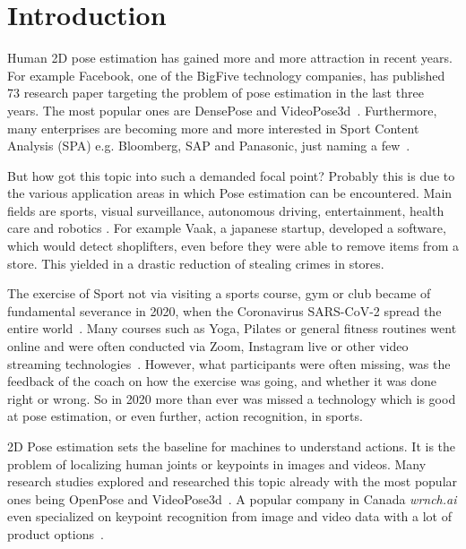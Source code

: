 

\chapter{Introduction} %

\label{introduction} %
\begin{flushleft}
Human 2D pose estimation has gained more and more attraction in recent years.
For example Facebook, one of the BigFive technology companies, has published 73 research paper targeting the problem of pose estimation in the last three years.
The most popular ones are DensePose and VideoPose3d~\cite{fbPub, DensePose, videopose3d}.
Furthermore, many enterprises are becoming more and more interested in Sport Content Analysis (SPA)
e.g. Bloomberg, SAP and Panasonic, just naming a few~\cite{sappanasonic, spaBloomberg}.
\end{flushleft}
\begin{flushleft}
But how got this topic into such a demanded focal point?
Probably this is due to the various application areas in which Pose estimation can be encountered.
Main fields are sports, visual surveillance, autonomous driving, entertainment, health care and robotics \cite{olympicsport, surveillance, kinectWalkDepression}.
For example Vaak, a japanese startup, developed a software, which would detect shoplifters,
even before they were able to remove items from a store.
This yielded in a drastic reduction of stealing crimes in stores.
\end{flushleft}
\begin{flushleft}
The exercise of Sport not via visiting a sports course, gym or club became of fundamental severance in 2020,
when the Coronavirus SARS-CoV-2 spread the entire world~\cite{coronarki}.
Many courses such as Yoga, Pilates or general fitness routines went online
and were often conducted via Zoom, Instagram live or other video streaming technologies~\cite{coronalife}.
However, what participants were often missing, was the feedback of the coach on how the exercise was going, and whether it was done right or wrong.
So in 2020 more than ever was missed a technology which is good at pose estimation, or even further, action recognition, in sports.
\end{flushleft}
\begin{flushleft}
2D Pose estimation sets the baseline for machines to understand actions.
It is the problem of localizing human joints or keypoints in images and videos.
Many research studies explored and researched this topic already with the most popular ones being OpenPose and VideoPose3d~\cite{openpose, videopose3d}.
A popular company in Canada \textit{wrnch.ai} even specialized on keypoint recognition from image and video data with a lot of product options~\cite{wrnch}.
\end{flushleft}
